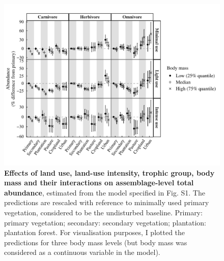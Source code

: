 \begin{figure}[h!]
\centering
\includegraphics[scale=0.9]{Supporting/Chapter5/Figures/Figure_Abundance_difference}
\caption[Effects of land use, land-use intensity, trophic group, body mass and their interactions on assemblage-level total abundance]{\textbf{Effects of land use, land-use intensity, trophic group, body mass and their interactions on assemblage-level total abundance}, estimated from the model specified in Fig. S1. The predictions are rescaled with reference to minimally used primary vegetation, considered to be the undisturbed baseline. Primary: primary vegetation; secondary: secondary vegetation; plantation: plantation forest. For visualisation purposes, I plotted the predictions for three body mass levels (but body mass was considered as a continuous variable in the model).}
\label{SI5_figure2}
\end{figure}



